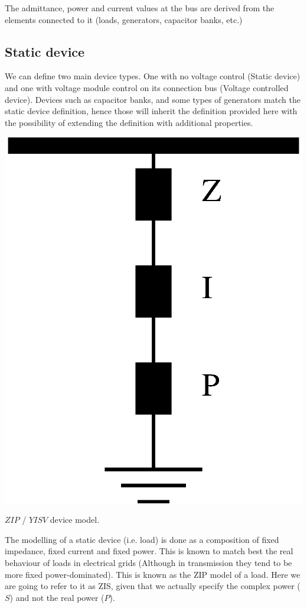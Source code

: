 \documentclass[nols,a4paper,twoside,symmetric,notoc,fleqn]{tufte-book}
\begin{document}
The admittance, power and current values at the bus are derived from the elements connected to it (loads, generators, capacitor banks, etc.)


\subsection{Static device}

We can define two main device types. One with no voltage control (Static device) and one with voltage module control on its connection bus (Voltage controlled device). Devices such as capacitor banks, and some types of generators match the static device definition, hence those will inherit the definition provided here with the possibility of extending the definition with additional properties.

\begin{marginfigure}
	\includegraphics[width=0.99\linewidth]{img/ZIP_model.eps}
	\caption{$ZIP$ / $YISV$ device model.}
	\label{zip_model}
\end{marginfigure}

The modelling of a static device (i.e. load) is done as a composition of fixed impedance, fixed current and fixed power. This is known to match best the real behaviour of loads in electrical grids (Although in transmission they tend to be more fixed power-dominated). This is known as the ZIP model of a load. Here we are going to refer to it as ZIS, given that we actually specify the complex power ($S$) and not the real power ($P$).
\end{document}
